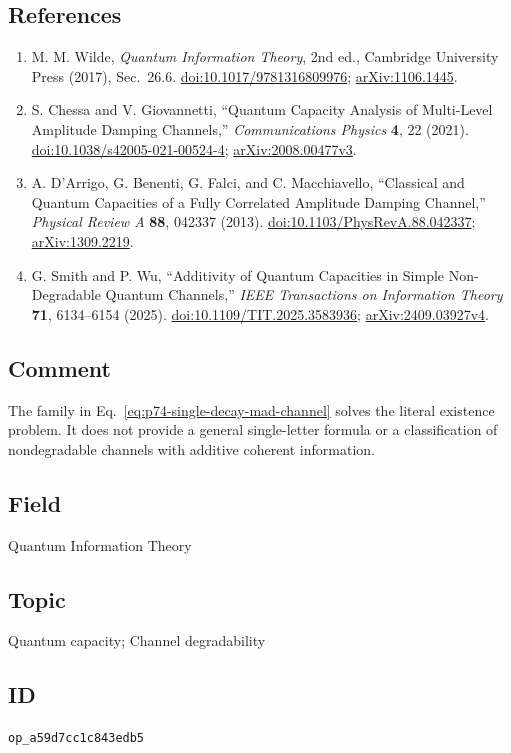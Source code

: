 \subsection*{References}

\begin{enumerate}[label={},leftmargin=4.8em,labelsep=0.5em]
  \footnotesize
  \item[\textup{[Wil17]}]\label{ref:p74-wilde}
  M. M. Wilde, \emph{Quantum Information Theory}, 2nd ed., Cambridge
  University Press (2017), Sec.~26.6.
  \href{https://doi.org/10.1017/9781316809976}{doi:10.1017/9781316809976};
  \href{https://arxiv.org/abs/1106.1445}{arXiv:1106.1445}.

  \item[\textup{[CG21]}]\label{ref:p74-chessa-giovannetti}
  S. Chessa and V. Giovannetti, ``Quantum Capacity Analysis of Multi-Level
  Amplitude Damping Channels,'' \emph{Communications Physics} \textbf{4}, 22
  (2021).
  \href{https://doi.org/10.1038/s42005-021-00524-4}{doi:10.1038/s42005-021-00524-4};
  \href{https://arxiv.org/abs/2008.00477v3}{arXiv:2008.00477v3}.

  \item[\textup{[DBF+13]}]\label{ref:p74-darrigo-et-al}
  A. D'Arrigo, G. Benenti, G. Falci, and C. Macchiavello,
  ``Classical and Quantum Capacities of a Fully Correlated Amplitude Damping
  Channel,'' \emph{Physical Review A} \textbf{88}, 042337 (2013).
  \href{https://doi.org/10.1103/PhysRevA.88.042337}{doi:10.1103/PhysRevA.88.042337};
  \href{https://arxiv.org/abs/1309.2219}{arXiv:1309.2219}.

  \item[\textup{[SW25]}]\label{ref:p74-smith-wu}
  G. Smith and P. Wu, ``Additivity of Quantum Capacities in Simple
  Non-Degradable Quantum Channels,'' \emph{IEEE Transactions on Information
  Theory} \textbf{71}, 6134--6154 (2025).
  \href{https://doi.org/10.1109/TIT.2025.3583936}{doi:10.1109/TIT.2025.3583936};
  \href{https://arxiv.org/abs/2409.03927v4}{arXiv:2409.03927v4}.
\end{enumerate}

\subsection*{Comment}

The family in Eq.~\eqref{eq:p74-single-decay-mad-channel} solves the literal
existence problem.  It does not provide a general single-letter formula or a
classification of nondegradable channels with additive coherent information.

\subsection*{Field}

Quantum Information Theory

\subsection*{Topic}

Quantum capacity; Channel degradability

\subsection*{ID}

\texttt{op\_a59d7cc1c843edb5}
